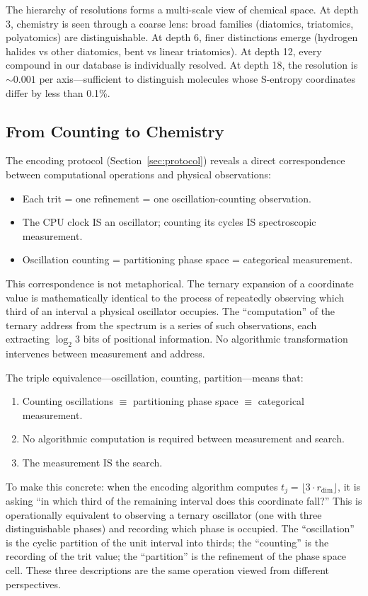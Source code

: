 \documentclass[11pt,twocolumn,a4paper]{article}
\theoremstyle{definition}
\theoremstyle{remark}
\begin{document}
The hierarchy of resolutions forms a multi-scale view of chemical space. At depth 3, chemistry is seen through a coarse lens: broad families (diatomics, triatomics, polyatomics) are distinguishable. At depth 6, finer distinctions emerge (hydrogen halides vs other diatomics, bent vs linear triatomics). At depth 12, every compound in our database is individually resolved. At depth 18, the resolution is $\sim 0.001$ per axis---sufficient to distinguish molecules whose S-entropy coordinates differ by less than 0.1\%.

\subsection{From Counting to Chemistry}

The encoding protocol (Section~\ref{sec:protocol}) reveals a direct correspondence between computational operations and physical observations:

\begin{itemize}[nosep]
\item Each trit = one refinement = one oscillation-counting observation.
\item The CPU clock IS an oscillator; counting its cycles IS spectroscopic measurement.
\item Oscillation counting = partitioning phase space = categorical measurement.
\end{itemize}

This correspondence is not metaphorical. The ternary expansion of a coordinate value is mathematically identical to the process of repeatedly observing which third of an interval a physical oscillator occupies. The ``computation'' of the ternary address from the spectrum is a series of such observations, each extracting $\log_2 3$ bits of positional information. No algorithmic transformation intervenes between measurement and address.

The triple equivalence---oscillation, counting, partition---means that:

\begin{enumerate}[nosep]
\item Counting oscillations $\equiv$ partitioning phase space $\equiv$ categorical measurement.
\item No algorithmic computation is required between measurement and search.
\item The measurement IS the search.
\end{enumerate}

To make this concrete: when the encoding algorithm computes $t_j = \lfloor 3 \cdot r_{\mathrm{dim}} \rfloor$, it is asking ``in which third of the remaining interval does this coordinate fall?'' This is operationally equivalent to observing a ternary oscillator (one with three distinguishable phases) and recording which phase is occupied. The ``oscillation'' is the cyclic partition of the unit interval into thirds; the ``counting'' is the recording of the trit value; the ``partition'' is the refinement of the phase space cell. These three descriptions are the same operation viewed from different perspectives.
\end{document}
